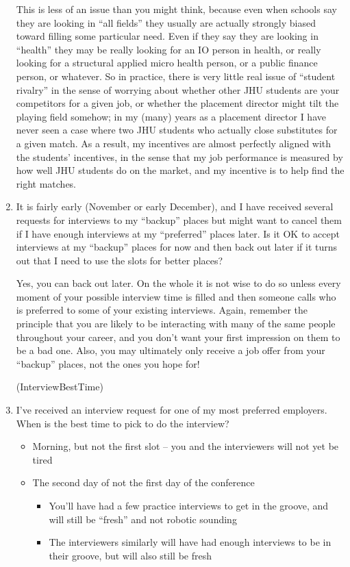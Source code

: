 \documentclass{econtex}
\providecommand\phantomsection{}
\begin{document}
\begin{enumerate}
  This is less of an issue than you might think, because even when schools say they are looking in ``all fields'' they usually are actually strongly biased toward filling some particular need.  Even if they say they are looking in ``health'' they may be really looking for an IO person in health, or really looking for a structural applied micro health person, or a public finance person, or whatever.  So in practice, there is very little real issue of ``student rivalry'' in the sense of worrying about whether other JHU students are your competitors for a given job, or whether the placement director might tilt the playing field somehow; in my (many) years as a placement director I have never seen a case where two JHU students who actually close substitutes for a given match.  As a result, my incentives are almost perfectly aligned with the students' incentives, in the sense that my job performance is measured by how well JHU students do on the market, and my incentive is to help find the right matches.

\item It is fairly early (November or early December), and I have received several requests for interviews to my ``backup'' places but might want to cancel them if I have enough interviews at my ``preferred'' places later.  Is it OK to accept interviews at my ``backup'' places for now and then back out later if it turns out that I need to use the slots for better places?

  Yes, you can back out later.  On the whole it is not wise to do so unless every moment of your possible interview time is filled and then someone calls who is preferred to some of your existing interviews.  Again, remember the principle that you are likely to be interacting with many of the same people throughout your career, and you don't want your first impression on them to be a bad one.  Also, you may ultimately only receive a job offer from your ``backup'' places, not the ones you hope for!

  \ifdvi\phantomsection\hypertarget{InterviewBestTime}{(InterviewBestTime)}\fi
  
\item I've received an interview request for one of my most preferred employers. When is the best time to pick to do the interview?
  \begin{itemize}
  \item Morning, but not the first slot -- you and the interviewers will not yet be tired
  \item The second day of not the first day of the conference
    \begin{itemize}
    \item You'll have had a few practice interviews to get in the groove, and will still be ``fresh'' and not robotic sounding
    \item The interviewers similarly will have had enough interviews to be in their groove, but will also still be fresh
    \end{itemize}
  \end{itemize}


\end{enumerate}
\end{document}
